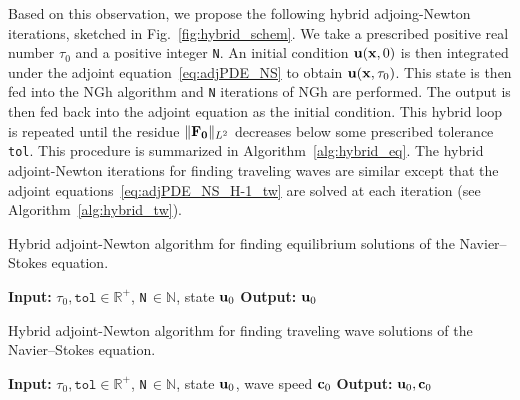 \documentclass{article}
\begin{document}
Based on this observation, we propose the following hybrid adjoing-Newton iterations,
sketched in Fig.~\ref{fig:hybrid_schem}.
We take
a prescribed positive real number $\tau_0$ and a positive integer \texttt{N}. An initial
condition $\mathbf u(\mathbf x,0)$ is then integrated under the adjoint equation~\eqref{eq:adjPDE_NS} to
obtain $\mathbf u(\mathbf x,\tau_0)$. This state is then fed into the NGh algorithm and \texttt{N}
iterations of NGh are performed. The output is then fed back into the adjoint equation
as the initial condition. This hybrid loop is repeated until the residue $\|\mathbf F_{\mathbf 0}\|_{L^2}$
decreases below some prescribed tolerance \texttt{tol}. This procedure is summarized
in Algorithm~\ref{alg:hybrid_eq}.
The hybrid adjoint-Newton iterations for finding traveling waves are similar except
that the adjoint equations~\eqref{eq:adjPDE_NS_H-1_tw} are solved at each iteration
(see Algorithm~\ref{alg:hybrid_tw}).
\begin{algorithm}
\DontPrintSemicolon
\caption{Hybrid adjoint-Newton algorithm for finding equilibrium solutions of the
Navier--Stokes equation.}
\textbf{Input:} $\tau_0,\texttt{tol}\in\mathbb R^+$,
\texttt{N}$\,\in\mathbb N$, state $\mathbf
u_0$\;
\textbf{Output:} $\mathbf u_0$
\label{alg:hybrid_eq}
\end{algorithm}
%
\begin{algorithm}
\DontPrintSemicolon
\caption{Hybrid adjoint-Newton algorithm for finding traveling wave solutions of the
Navier--Stokes equation.}
\textbf{Input:} $\tau_0,\texttt{tol}\in\mathbb R^+$,
\texttt{N}$\,\in\mathbb N$, state $\mathbf u_0$, wave speed $\mathbf c_0$\;
\textbf{Output:} $\mathbf u_0, \mathbf c_0$
\label{alg:hybrid_tw}
\end{algorithm}
\end{document}
